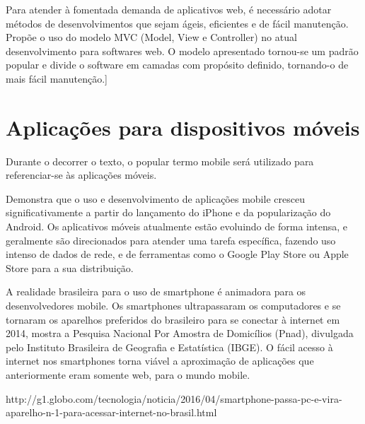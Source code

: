 Para atender à fomentada demanda de aplicativos web, é necessário adotar métodos de desenvolvimentos que sejam ágeis, eficientes e de fácil manutenção. \cite{1372143} Propõe o uso do modelo MVC (Model, View e Controller) no atual desenvolvimento para softwares web. O modelo apresentado tornou-se um padrão popular e divide o software em camadas com propósito definido, tornando-o de mais fácil manutenção.]


\section{Aplicações para dispositivos móveis}\label{sec:apps_mobile}


Durante o decorrer o texto, o popular termo mobile será utilizado para referenciar-se às aplicações móveis. 


\cite{6248786} Demonstra que o uso e desenvolvimento de aplicações mobile cresceu significativamente a partir do lançamento do iPhone e da popularização do Android. Os aplicativos móveis atualmente estão  evoluindo de forma intensa, e geralmente são direcionados para atender uma tarefa específica, fazendo uso intenso de dados de rede, e  de ferramentas como o Google Play Store ou Apple Store para a sua distribuição.


A realidade brasileira para o uso de smartphone é animadora para os desenvolvedores mobile. Os smartphones ultrapassaram os computadores e se tornaram os aparelhos preferidos do brasileiro para se conectar à internet em 2014, mostra a Pesquisa Nacional Por Amostra de Domicílios (Pnad), divulgada pelo Instituto Brasileira de Geografia e Estatística (IBGE). O fácil acesso à internet nos smartphones torna viável a aproximação de aplicações que anteriormente eram somente web, para o mundo mobile.


http://g1.globo.com/tecnologia/noticia/2016/04/smartphone-passa-pc-e-vira-aparelho-n-1-para-acessar-internet-no-brasil.html





